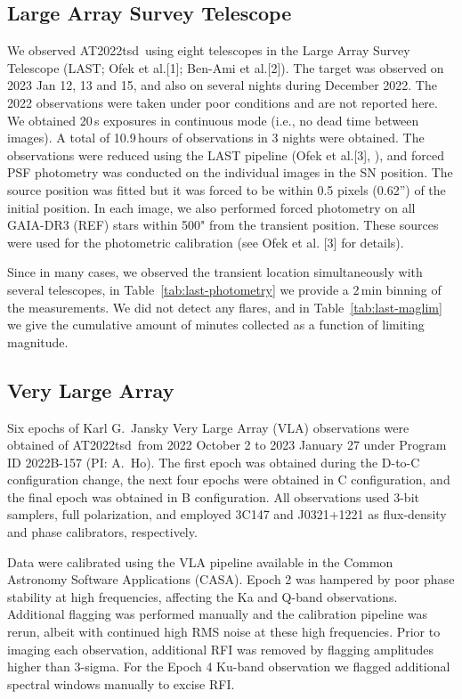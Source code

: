 \documentclass{nature_plusfigure}
\newcommand{\at}{AT2022tsd}
\begin{document}
\begin{methods}
\subsection{Large Array Survey Telescope}
\label{sec:last}

We observed \at\ using eight telescopes in the Large Array Survey Telescope (LAST; Ofek et al.[1]; Ben-Ami et al.[2]).
The target was observed on 2023 Jan 12, 13 and 15, and also on several nights during December 2022.
The 2022 observations were taken under poor conditions and are not reported here.
We obtained 20\,s exposures in continuous mode (i.e., no dead time between images).
A total of 10.9\,hours of observations in 3 nights were obtained.
The observations were reduced using the LAST pipeline
(Ofek et al.[3], \cite{Ofek2014,Ofek2019}), and forced PSF photometry was conducted on the individual images
in the SN position. 
The source position was fitted but it was forced to be within 0.5 pixels (0.62'') of the initial position.
In each image, we also performed forced photometry on all GAIA-DR3 (REF) stars
within 500" from the transient position.
These sources were used for the photometric calibration (see Ofek et al. [3] for details).

Since in many cases, we observed the transient location simultaneously with several telescopes, in Table~\ref{tab:last-photometry} we provide a 2\,min binning of the measurements. We did not detect any flares, and in Table~\ref{tab:last-maglim} we give the cumulative amount of minutes collected as a function of limiting magnitude.

\subsection{Very Large Array}
\label{Methods:VLA}

Six epochs of Karl G.\ Jansky Very Large Array (VLA\cite{Perley2011}) observations were obtained of \at\ from 2022 October 2 to 2023 January 27 under Program ID 2022B-157 (PI: A.\ Ho).
The first epoch was obtained during the D-to-C configuration change, the next four epochs were obtained in C configuration, and the final epoch was obtained in B configuration.
All observations used 3-bit samplers, full polarization, and employed 3C147 and J0321+1221 as flux-density and phase calibrators, respectively.

Data were calibrated using the VLA pipeline available in the Common Astronomy Software Applications (CASA\cite{McMullin2007}).
Epoch 2 was hampered by poor phase stability at high frequencies, affecting the Ka and Q-band observations. Additional flagging was performed manually and the calibration pipeline was rerun, albeit with continued high RMS noise at these high frequencies.
Prior to imaging each observation, additional RFI was removed by flagging amplitudes higher than 3-sigma.
For the Epoch 4 Ku-band observation we flagged additional spectral windows manually to excise RFI.


\end{methods}
\end{document}
